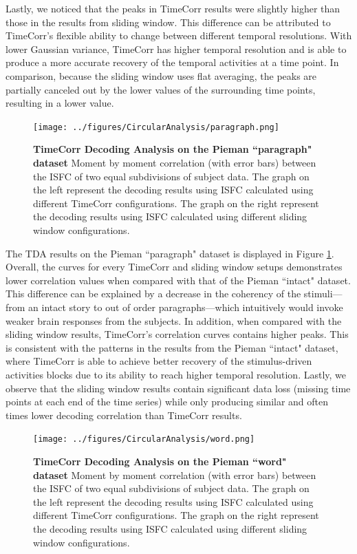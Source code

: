 \documentclass[11pt]{article}
\begin{document}
Lastly, we noticed that the peaks in TimeCorr results were slightly higher than those in the results from sliding window. This difference can be attributed to TimeCorr's flexible ability to change between different temporal resolutions. With lower Gaussian variance, TimeCorr has higher temporal resolution and is able to produce a more accurate recovery of the temporal activities at a time point. In comparison, because the sliding window uses flat averaging, the peaks are partially canceled out by the lower values of the surrounding time points, resulting in a lower value.

\begin{figure}[!htb]
\texttt{[image: ../figures/CircularAnalysis/paragraph.png]}
\caption{\textbf{TimeCorr Decoding Analysis on the Pieman ``paragraph" dataset} Moment by moment correlation (with error bars) between the ISFC of two equal subdivisions of subject data. The graph on the left represent the decoding results using ISFC calculated using different TimeCorr configurations. The graph on the right represent the decoding results using ISFC calculated using different sliding window configurations.}
\label{fig:paragraph}
\end{figure}

The TDA results on the Pieman ``paragraph" dataset is displayed in Figure \ref{fig:paragraph}.
Overall, the curves for every TimeCorr and sliding window setups demonstrates lower correlation values when compared with that of the Pieman ``intact" dataset. This difference can be explained by a decrease in the coherency of the stimuli---from an intact story to out of order paragraphs---which intuitively would invoke weaker brain responses from the subjects. In addition, when compared with the sliding window results, TimeCorr's correlation curves contains higher peaks. This is consistent with the patterns in the results from the Pieman ``intact" dataset, where TimeCorr is able to achieve better recovery of the stimulus-driven activities blocks due to its ability to reach higher temporal resolution. Lastly, we observe that the sliding window results contain significant data loss (missing time points at each end of the time series) while only producing similar and often times lower decoding correlation than TimeCorr results.

\begin{figure}[!htb]
\texttt{[image: ../figures/CircularAnalysis/word.png]}
\caption{\textbf{TimeCorr Decoding Analysis on the Pieman ``word" dataset} Moment by moment correlation (with error bars) between the ISFC of two equal subdivisions of subject data. The graph on the left represent the decoding results using ISFC calculated using different TimeCorr configurations. The graph on the right represent the decoding results using ISFC calculated using different sliding window configurations.}
\label{fig:word}
\end{figure}
\end{document}
